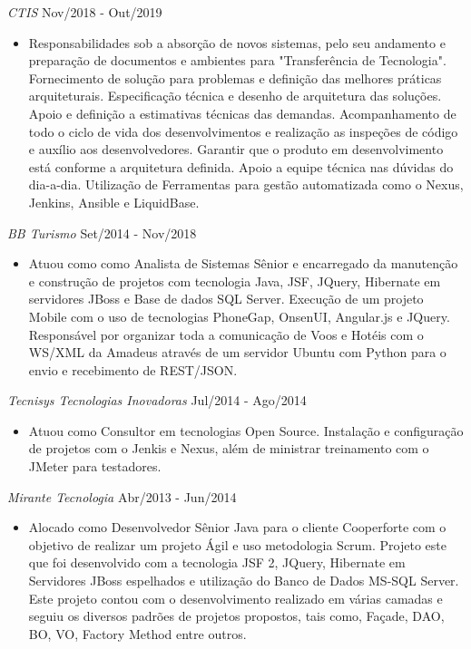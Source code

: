 \documentclass{res}
\begin{document}
\begin{resume}
{\sl CTIS} \hfill Nov/2018 - Out/2019
\begin{itemize}
	\item Responsabilidades sob a absorção de novos sistemas, pelo seu andamento e preparação de documentos e ambientes para "Transferência de Tecnologia". Fornecimento de solução para problemas e definição das melhores práticas arquiteturais. Especificação técnica e desenho de arquitetura das soluções. Apoio e definição a estimativas técnicas das demandas. Acompanhamento de todo o ciclo de vida dos desenvolvimentos e realização as inspeções de código e auxílio aos desenvolvedores. Garantir que o produto em desenvolvimento está conforme a arquitetura definida. Apoio a equipe técnica nas dúvidas do dia-a-dia. Utilização de Ferramentas para gestão automatizada como o Nexus, Jenkins, Ansible e LiquidBase.
\end{itemize}

{\sl BB Turismo} \hfill Set/2014 - Nov/2018
\begin{itemize}
  \item Atuou como como Analista de Sistemas Sênior e encarregado da manutenção e construção de projetos com tecnologia Java, JSF, JQuery, Hibernate em servidores JBoss e Base de dados SQL Server. Execução de um projeto Mobile com o uso de tecnologias PhoneGap, OnsenUI, Angular.js e JQuery. Responsável por organizar toda a comunicação de Voos e Hotéis com o WS/XML da Amadeus através de um servidor Ubuntu com Python para o envio e recebimento de REST/JSON.
\end{itemize}

{\sl Tecnisys Tecnologias Inovadoras} \hfill Jul/2014 - Ago/2014
\begin{itemize}
  \item Atuou como Consultor em tecnologias Open Source. Instalação e configuração de 
  projetos com o Jenkis e Nexus, além de ministrar treinamento com o JMeter para testadores.
\end{itemize}
 
{\sl Mirante Tecnologia} \hfill Abr/2013 - Jun/2014
\begin{itemize}
  \item Alocado como Desenvolvedor Sênior Java para o cliente Cooperforte com o objetivo de 
  realizar um projeto Ágil e uso metodologia Scrum. Projeto este que foi desenvolvido com a 
  tecnologia JSF 2, JQuery, Hibernate em Servidores JBoss espelhados e utilização do Banco de 
  Dados MS-SQL Server. Este projeto contou com o desenvolvimento realizado em várias camadas e 
  seguiu os diversos padrões de projetos propostos, tais como, Façade, DAO, BO, VO, Factory 
  Method entre outros. 
\end{itemize}


\end{resume}
\end{document}
